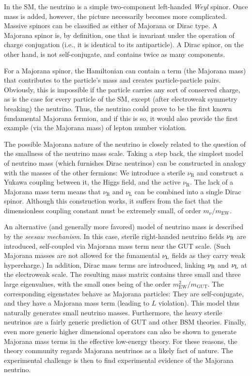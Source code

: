 \documentclass[../thesis.tex]{subfiles}
\begin{document}
In the SM, the neutrino is a simple two-component left-handed \emph{Weyl} spinor. Once mass is added, however, the picture necessarily becomes more complicated. Massive spinors can be classified as either of Majorana or Dirac type. A Majorana spinor is, by definition, one that is invariant under the operation of charge conjugation (i.e., it is identical to its antiparticle). A Dirac spinor, on the other hand, is not self-conjugate, and contains twice as many components.

For a Majorana spinor, the Hamiltonian can contain a term (the Majorana mass) that contributes to the particle's mass and creates particle-particle pairs. Obviously, this is impossible if the particle carries any sort of conserved charge, as is the case for every particle of the SM, except (after electroweak symmetry breaking) the neutrino. Thus, the neutrino could prove to be the first known fundamental Majorana fermion, and if this is so, it would also provide the first example (via the Majorana mass) of lepton number violation.

The possible Majorana nature of the neutrino is closely related to the question of the smallness of the neutrino mass scale. Taking a step back, the simplest model of neutrino mass (which furnishes Dirac neutrinos) can be constructed in analogy with the masses of the other fermions: We introduce a sterile $\nu_{\text{R}}$ and construct a Yukawa coupling between it, the Higgs field, and the active $\nu_{\text{R}}$. The lack of a Majorana mass term means that $\nu_{\text{R}}$ and $\nu_{\text{L}}$ can be combined into a single Dirac spinor. Although this construction works, it suffers from the fact that the dimensionless coupling constant must be extremely small, of order $m_\nu/m_{\text{EW}}$.

An alternative (and generally more favored) model of neutrino mass is described by the \emph{seesaw mechanism}. In this case, sterile right-handed neutrino fields $\nu_{\text{R}}$ are introduced, self-coupled via Majorana mass term near the GUT scale. (Such Majorana masses are not allowed for the funamental $\nu_{\text{L}}$ fields as they carry weak hypercharge.) In addition, Dirac mass terms are introduced, linking $\nu_{\text{R}}$ and $\nu_{\text{L}}$ at the electroweak scale. The resulting mass matrix contains three small and three large eigenvalues, with the small ones being of the order \(m^2_{\text{EW}} / m_{\text{GUT}}\). The corresponding eigenstates behave as Majorana particles: They are self-conjugate, and they have a Majorana mass term (leading to $L$ violation). This model thus naturally generates small neutrino masses. Furthermore, the heavy sterile neutrinos are a fairly generic prediction of GUT and other BSM theories. Finally, even more generic higher dimensional operators can also be shown to generate Majorana mass terms in the effective low-energy theory. For these reasons, the theory community regards Majorana neutrinos as a likely fact of nature. The experimental challenge is then to find experimental evidence of the Majorana neutrino.
\end{document}
